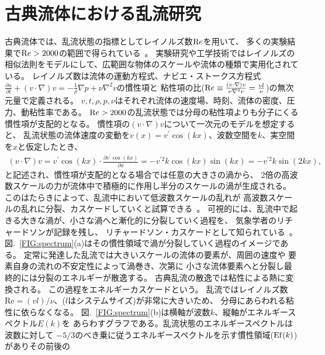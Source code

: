\documentclass[12pt,a4paper]{jbook}
\begin{document}
		\section{古典流体における乱流研究}
		古典流体では、乱流状態の指標としてレイノルズ数${\textrm Re}$を用いて、
		多くの実験結果で${\textrm Re} > 2000$の範囲で得られている~\cite{Reynolds,Goto2}。
		実験研究や工学技術ではレイノルズの相似法則をモデルにして、広範囲な物体のスケールや流体の種類で実用化されている。
		レイノルズ数は流体の運動方程式、ナビエ・ストークス方程式
		$\frac{\partial u}{\partial t} + (v \cdot \nabla) v = -\frac{1}{\rho}\nabla p + \nu \nabla^2 v$の慣性項と
		粘性項の比(${\textrm Re} \equiv \frac{(v \cdot \nabla)v}{\nu \nabla^2 v}=\frac{v l}{\nu}$)の無次元量で定義される。
        $v, t, \rho, p, \nu$はそれぞれ流体の速度場、時刻、流体の密度、圧力、動粘性率である。
		${\textrm Re} > 2000$の乱流状態では分母の粘性項よりも分子にくる慣性項が支配的となる。
		慣性項の$(v \cdot \nabla) v$について一次元のモデルを想定すると、
		乱流状態の流体速度の変動を$v(x)=v^\prime \cos(kx)$、波数空間を$k$、実空間を$x$と仮定したとき、
		\begin{eqnarray}
			(v \cdot \nabla) v = v^\prime \cos(kx) \cdot \frac{\partial v^\prime \cos(kx)}{\partial x}
			= -v^{\prime2} k \cos (kx) \sin (kx) = -v^{\prime2} k \sin (2kx),
		\end{eqnarray}
		と記述され、慣性項が支配的となる場合では任意の大きさの渦から、
        $2$倍の高波数スケールの力が流体中で積極的に作用し半分のスケールの渦が生成される。
		このはたらきによって、乱流中において低波数スケールの乱れが
		高波数スケールの乱れに分裂、カスケードしていくと試算できる~\cite{Tatsumi2}。
		可視的には、乱流中で起きる大きな渦が、小さな渦へと漸化的に分裂していく過程を、
        気象学者のリチャードソンが記録を残し、
		リチャードソン・カスケードとして知られている~\cite{Richardson}。
        図.~\ref{FIG:spectrum}(a)はその慣性領域で渦が分裂していく過程のイメージである。
        定常に発達した乱流では大きいスケールの流体の要素が、周囲の速度や
        要素自身の流れの不安定性によって渦巻き、次第に
        小さな流体要素へと分裂し最終的には分裂のエネルギーが散逸する。
        古典乱流の散逸では粘性による熱に変換される。
        この過程をエネルギーカスケードという。
        乱流ではレイノルズ数$\textrm{Re}=(v l)/\nu$、($l$はシステムサイズ)が非常に大きいため、
        分母にあらわれる粘性に依らなくなる。
        図.~\ref{FIG:spectrum}(b)は横軸が波数$k$、縦軸がエネルギースペクトル$E(k)$を
        あらわすグラフである。乱流状態のエネルギースペクトルは波数に対して
        $-5/3$のべき乗に従うエネルギースペクトルを示す慣性領域(${\rm Ef}(k)$)がありその前後の
\end{document}
